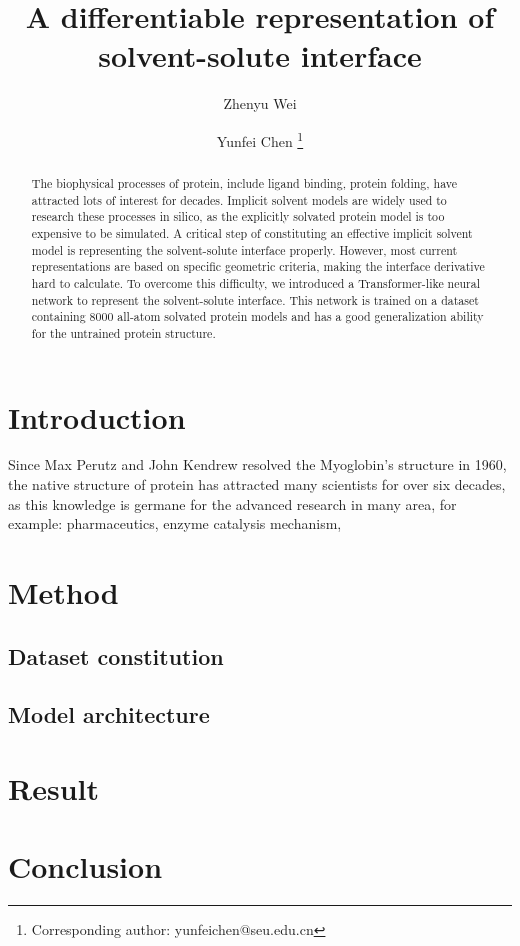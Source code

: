 \documentclass[11pt,a4paper]{article}
\title{\textbf{A differentiable representation of solvent-solute interface}}
\author[$\dagger$]{Zhenyu Wei}
\author[$\dagger$]{Yunfei Chen \thanks{Corresponding author: yunfeichen@seu.edu.cn}}
\affil[$\dagger$]{School of Mechanical Engineering, Southeast University, Nanjing, China}
\date{}
\begin{document}
\linenumbers

\maketitle

\begin{abstract}
  The biophysical processes of protein, include ligand binding, protein folding, have attracted lots of interest for decades. Implicit solvent models are widely used to research these processes in silico, as the explicitly solvated protein model is too expensive to be simulated. A critical step of constituting an effective implicit solvent model is representing the solvent-solute interface properly. However, most current representations are based on specific geometric criteria, making the interface derivative hard to calculate. To overcome this difficulty, we introduced a Transformer-like neural network to represent the solvent-solute interface. This network is trained on a dataset containing 8000 all-atom solvated protein models and has a good generalization ability for the untrained protein structure. %
\end{abstract}

\section{Introduction}
  Since Max Perutz and John Kendrew resolved the Myoglobin's structure in 1960\cite{protein_str_01,protein_str_02,protein_str_03}, the native structure of protein has attracted many scientists for over six decades, as this knowledge is germane for the advanced research in many area, for example: pharmaceutics\cite{drug-01,drug-02,drug-03}, enzyme catalysis mechanism\cite{enzyme-01,enzyme-02, enzyme-03, enzyme-04},

\section{Method}

  \subsection{Dataset constitution}

  \subsection{Model architecture}

\section{Result}

\section{Conclusion}


\end{document}
